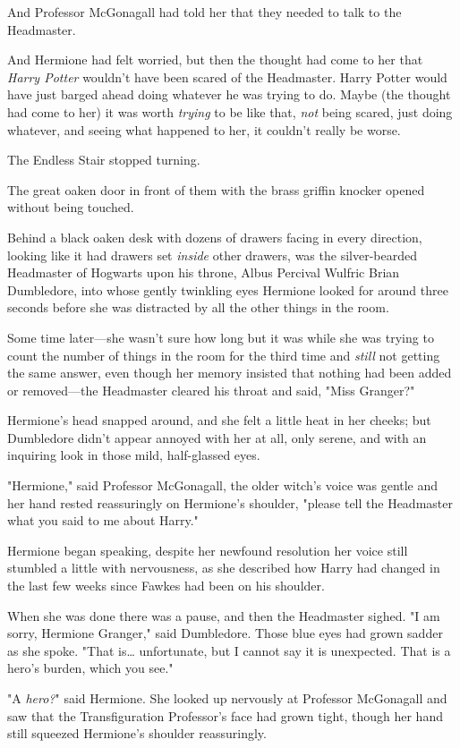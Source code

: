 And Professor McGonagall had told her that they needed to talk to the
Headmaster.

And Hermione had felt worried, but then the thought had come to her that
\emph{Harry Potter} wouldn't have been scared of the Headmaster. Harry Potter
would have just barged ahead doing whatever he was trying to do. Maybe (the
thought had come to her) it was worth \emph{trying} to be like that, \emph{not}
being scared, just doing whatever, and seeing what happened to her, it couldn't
really be worse.

The Endless Stair stopped turning.

The great oaken door in front of them with the brass griffin knocker opened
without being touched.

Behind a black oaken desk with dozens of drawers facing in every direction,
looking like it had drawers set \emph{inside} other drawers, was the
silver-bearded Headmaster of Hogwarts upon his throne, Albus Percival Wulfric
Brian Dumbledore, into whose gently twinkling eyes Hermione looked for around
three seconds before she was distracted by all the other things in the room.

Some time later---she wasn't sure how long but it was while she was trying to
count the number of things in the room for the third time and \emph{still} not
getting the same answer, even though her memory insisted that nothing had been
added or removed---the Headmaster cleared his throat and said, "Miss Granger?"

Hermione's head snapped around, and she felt a little heat in her cheeks; but
Dumbledore didn't appear annoyed with her at all, only serene, and with an
inquiring look in those mild, half-glassed eyes.

"Hermione," said Professor McGonagall, the older witch's voice was gentle and
her hand rested reassuringly on Hermione's shoulder, "please tell the
Headmaster what you said to me about Harry."

Hermione began speaking, despite her newfound resolution her voice still
stumbled a little with nervousness, as she described how Harry had changed in
the last few weeks since Fawkes had been on his shoulder.

When she was done there was a pause, and then the Headmaster sighed. "I am
sorry, Hermione Granger," said Dumbledore. Those blue eyes had grown sadder as
she spoke. "That is{\ldots} unfortunate, but I cannot say it is unexpected.
That is a hero's burden, which you see."

"A \emph{hero?}" said Hermione. She looked up nervously at Professor McGonagall
and saw that the Transfiguration Professor's face had grown tight, though her
hand still squeezed Hermione's shoulder reassuringly.

